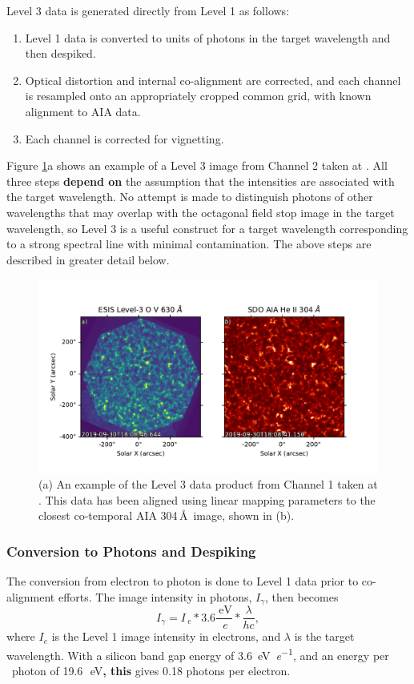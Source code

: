 \documentclass[linenumbers,trackchanges]{aastex63}
\begin{document}
Level 3 data is generated directly from Level 1 as follows:
\begin{enumerate}
    \item Level 1 data is converted to units of photons in the target wavelength and then despiked.\label{step:photons}
    \item Optical distortion and internal co-alignment are corrected, and each channel is resampled onto an appropriately cropped common grid, with known alignment to AIA data.\label{step:distortion}
    \item Each channel is corrected for vignetting.\label{step:vignetting}
\end{enumerate}
Figure \ref{fig:coalign}a shows an example of a Level 3 image from Channel 2 taken at \levthreetime. All three steps \textbf{depend on} the assumption that the intensities are associated with the target wavelength. No attempt is made to distinguish photons of other wavelengths that may overlap with the octagonal field stop image in the target wavelength, so Level 3 is a useful construct for a target wavelength corresponding to a strong spectral line with minimal contamination. The above steps are described in greater detail below.


	\begin{figure}
		\centering
		\includegraphics{aia_coalign.pdf}
		\caption{(a) An example of the Level 3 data product from Channel 1 taken at \levthreetime. This data has been aligned using linear mapping parameters to the closest co-temporal AIA 304\,\AA\ image, shown in (b). }
		\label{fig:coalign}
	\end{figure}
    	
    
\subsubsection{Conversion to Photons and Despiking}
The conversion from electron to photon is done to Level 1 data prior to co-alignment efforts.
The image intensity in photons, $I_{\gamma}$, then becomes
\begin{equation}
  I_{\gamma} = I_{\SI{}{\elementarycharge}} * 3.6 \frac{\SI{}{\electronvolt}}{\SI{}{\elementarycharge}} * \frac{\lambda}{hc},
\end{equation}
where $I_e$ is the Level 1 image intensity in electrons, and $\lambda$ is the target wavelength.
With a silicon band gap energy of \SI[per-mode=symbol]{3.6}{\electronvolt\per\elementarycharge}, and an energy per \ov \ photon 
of 19.6\,\SI{}{\electronvolt}\textbf{, this} gives 0.18 photons per electron.
\end{document}
